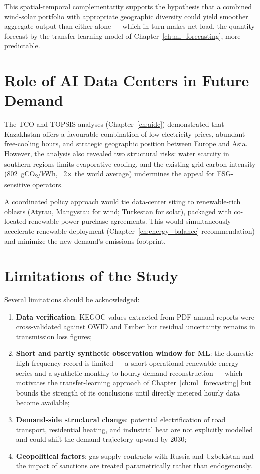 This spatial-temporal complementarity supports the hypothesis that a combined wind-solar portfolio with appropriate geographic diversity could yield smoother aggregate output than either alone --- which in turn makes net load, the quantity forecast by the transfer-learning model of Chapter~\ref{ch:ml_forecasting}, more predictable.

\section{Role of AI Data Centers in Future Demand}
\label{sec:disc_aidc_role}

The TCO and TOPSIS analyses (Chapter~\ref{ch:aidc}) demonstrated that Kazakhstan offers a favourable combination of low electricity prices, abundant free-cooling hours, and strategic geographic position between Europe and Asia. However, the analysis also revealed two structural risks: water scarcity in southern regions limits evaporative cooling, and the existing grid carbon intensity (802~gCO\textsubscript{2}/kWh, ~2$\times$ the world average) undermines the appeal for ESG-sensitive operators.

A coordinated policy approach would tie data-center siting to renewable-rich oblasts (Atyrau, Mangystau for wind; Turkestan for solar), packaged with co-located renewable power-purchase agreements. This would simultaneously accelerate renewable deployment (Chapter~\ref{ch:energy_balance} recommendation) and minimize the new demand's emissions footprint.

\section{Limitations of the Study}
\label{sec:disc_limitations}

Several limitations should be acknowledged:
\begin{enumerate}
    \item \textbf{Data verification}: KEGOC values extracted from PDF annual reports were cross-validated against OWID and Ember but residual uncertainty remains in transmission loss figures;
    \item \textbf{Short and partly synthetic observation window for ML}: the domestic high-frequency record is limited --- a short operational renewable-energy series and a synthetic monthly-to-hourly demand reconstruction --- which motivates the transfer-learning approach of Chapter~\ref{ch:ml_forecasting} but bounds the strength of its conclusions until directly metered hourly data become available;
    \item \textbf{Demand-side structural change}: potential electrification of road transport, residential heating, and industrial heat are not explicitly modelled and could shift the demand trajectory upward by 2030;
    \item \textbf{Geopolitical factors}: gas-supply contracts with Russia and Uzbekistan and the impact of sanctions are treated parametrically rather than endogenously.
\end{enumerate}

